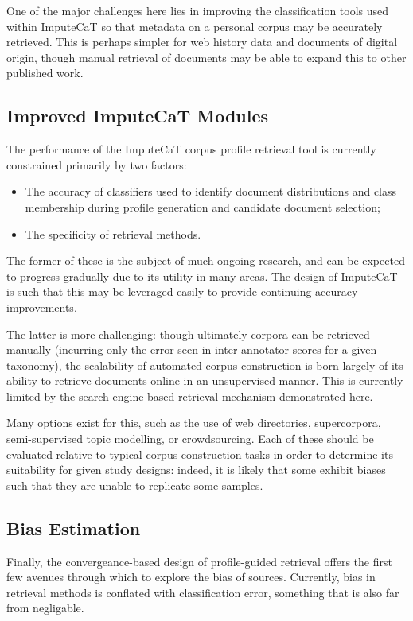 One of the major challenges here lies in improving the classification tools used within ImputeCaT so that metadata on a personal corpus may be accurately retrieved.  This is perhaps simpler for web history data and documents of digital origin, though manual retrieval of documents may be able to expand this to other published work.





\subsection{Improved ImputeCaT Modules}
The performance of the ImputeCaT corpus profile retrieval tool is currently constrained primarily by two factors:

\begin{itemize}
    \item The accuracy of classifiers used to identify document distributions and class membership during profile generation and candidate document selection;
    \item The specificity of retrieval methods.
\end{itemize}

The former of these is the subject of much ongoing research, and can be expected to progress gradually due to its utility in many areas.  The design of ImputeCaT is such that this may be leveraged easily to provide continuing accuracy improvements.

The latter is more challenging: though ultimately corpora can be retrieved manually (incurring only the error seen in inter-annotator scores for a given taxonomy\cite{sharoffs2015}), the scalability of automated corpus construction is born largely of its ability to retrieve documents online in an unsupervised manner.  This is currently limited by the search-engine-based retrieval mechanism demonstrated here.

Many options exist for this, such as the use of web directories, supercorpora, semi-supervised topic modelling, or crowdsourcing.  Each of these should be evaluated relative to typical corpus construction tasks in order to determine its suitability for given study designs: indeed, it is likely that some exhibit biases such that they are unable to replicate some samples.


\subsection{Bias Estimation}
Finally, the convergeance-based design of profile-guided retrieval offers the first few avenues through which to explore the bias of sources.  Currently, bias in retrieval methods is conflated with classification error, something that is also far from negligable.

